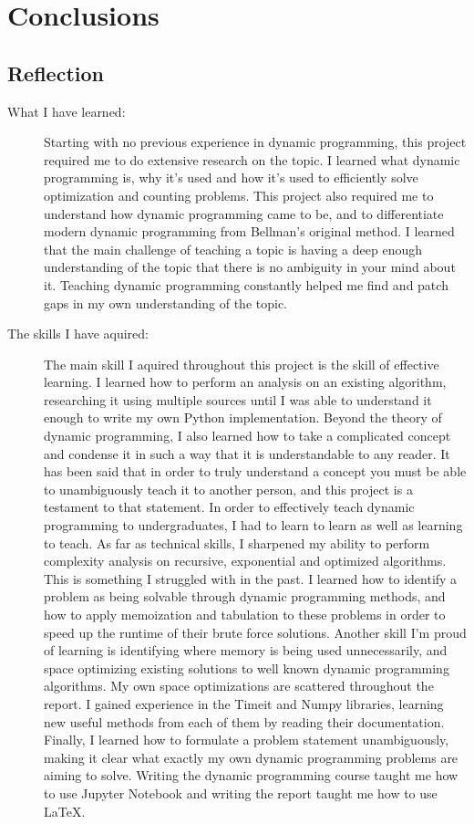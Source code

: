 \chapter{Conclusions}
\section{Reflection}
\begin{description}
    \item[What I have learned:]
    Starting with no previous experience in dynamic programming,
    this project required me to do extensive research on the topic.
    I learned what dynamic programming is, why it's used and how it's used to efficiently solve optimization and counting problems.
    This project also required me to understand how dynamic programming came to be, and to differentiate modern dynamic programming from Bellman's original method.
    I learned that the main challenge of teaching a topic is having a deep enough understanding of the topic that there is no ambiguity in your mind about it.
    Teaching dynamic programming constantly helped me find and patch gaps in my own understanding of the topic.
    
    \item[The skills I have aquired:]
    The main skill I aquired throughout this project is the skill of effective learning.
    I learned how to perform an analysis on an existing algorithm, researching it using multiple sources until I was able to understand it enough to write my own Python implementation.
    Beyond the theory of dynamic programming, I also learned how to take a complicated concept and condense it in such a way that it is understandable to any reader.
    It has been said that in order to truly understand a concept you must be able to unambiguously teach it to another person, and this project is a testament to that statement.
    In order to effectively teach dynamic programming to undergraduates, I had to learn to learn as well as learning to teach.
    As far as technical skills, I sharpened my ability to perform complexity analysis on recursive, exponential and optimized algorithms. This is something I struggled with in the past.
    I learned how to identify a problem as being solvable through dynamic programming methods, and how to apply memoization and tabulation to these problems in order to speed up the runtime of their brute force solutions.
    Another skill I'm proud of learning is identifying where memory is being used unnecessarily, and space optimizing existing solutions to well known dynamic programming algorithms. My own space optimizations are scattered throughout the report.
    I gained experience in the Timeit and Numpy libraries, learning new useful methods from each of them by reading their documentation.
    Finally, I learned how to formulate a problem statement unambiguously, making it clear what exactly my own dynamic programming problems are aiming to solve.
    Writing the dynamic programming course taught me how to use Jupyter Notebook and writing the report taught me how to use LaTeX.
\end{description}
